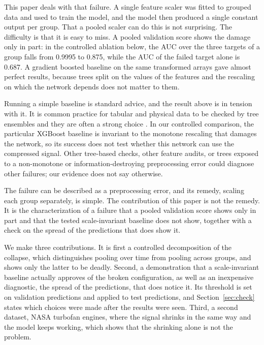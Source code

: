 \documentclass{IEEEtaes}
\begin{document}
This paper deals with that failure. A single feature scaler was fitted to grouped data and used to train the model, and the model then produced a single constant output per group. That a pooled scaler can do this is not surprising. The difficulty is that it is easy to miss. A pooled validation score shows the damage only in part: in the controlled ablation below, the AUC over the three targets of a group falls from 0.9995 to 0.875, while the AUC of the failed target alone is 0.687. A gradient boosted baseline on the same transformed arrays gave almost perfect results, because trees split on the values of the features and the rescaling on which the network depends does not matter to them.

Running a simple baseline is standard advice, and the result above is in tension with it. It is common practice for tabular and physical data to be checked by tree ensembles and they are often a strong choice \cite{chen2016,grinsztajn2022,shwartz2022}. In our controlled comparison, the particular XGBoost baseline is invariant to the monotone rescaling that damages the network, so its success does not test whether this network can use the compressed signal. Other tree-based checks, other feature audits, or trees exposed to a non-monotone or information-destroying preprocessing error could diagnose other failures; our evidence does not say otherwise.

The failure can be described as a preprocessing error, and its remedy, scaling each group separately, is simple. The contribution of this paper is not the remedy. It is the characterization of a failure that a pooled validation score shows only in part and that the tested scale-invariant baseline does not show, together with a check on the spread of the predictions that does show it.

We make three contributions. It is first a controlled decomposition of the collapse, which distinguishes pooling over time from pooling across groups, and shows only the latter to be deadly. Second, a demonstration that a scale-invariant baseline actually approves of the broken configuration, as well as an inexpensive diagnostic, the spread of the predictions, that does notice it. Its threshold is set on validation predictions and applied to test predictions, and Section~\ref{sec:check} states which choices were made after the results were seen. Third, a second dataset, NASA turbofan engines, where the signal shrinks in the same way and the model keeps working, which shows that the shrinking alone is not the problem.
\end{document}
